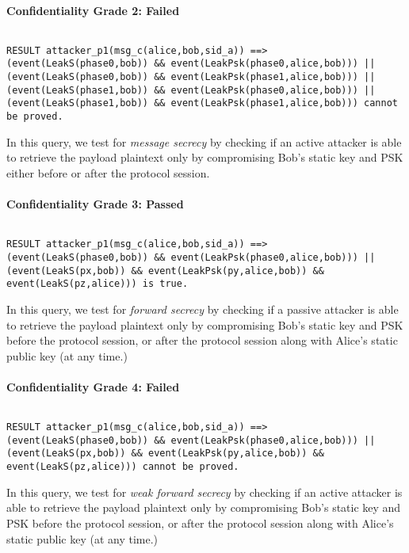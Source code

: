 \paragraph{Confidentiality Grade 2: Failed}$ $
\begin{lstlisting}
RESULT attacker_p1(msg_c(alice,bob,sid_a)) ==> (event(LeakS(phase0,bob)) && event(LeakPsk(phase0,alice,bob))) || (event(LeakS(phase0,bob)) && event(LeakPsk(phase1,alice,bob))) || (event(LeakS(phase1,bob)) && event(LeakPsk(phase0,alice,bob))) || (event(LeakS(phase1,bob)) && event(LeakPsk(phase1,alice,bob))) cannot be proved.
\end{lstlisting}

In this query, we test for \emph{message secrecy} by checking if an active attacker is able to retrieve the payload plaintext only by compromising Bob's static key and PSK either before or after the protocol session.


\paragraph{Confidentiality Grade 3: Passed}$ $
\begin{lstlisting}
RESULT attacker_p1(msg_c(alice,bob,sid_a)) ==> (event(LeakS(phase0,bob)) && event(LeakPsk(phase0,alice,bob))) || (event(LeakS(px,bob)) && event(LeakPsk(py,alice,bob)) && event(LeakS(pz,alice))) is true.
\end{lstlisting}

In this query, we test for \emph{forward secrecy} by checking if a passive attacker is able to retrieve the payload plaintext only by compromising Bob's static key and PSK before the protocol session, or after the protocol session along with Alice's static public key (at any time.)


\paragraph{Confidentiality Grade 4: Failed}$ $
\begin{lstlisting}
RESULT attacker_p1(msg_c(alice,bob,sid_a)) ==> (event(LeakS(phase0,bob)) && event(LeakPsk(phase0,alice,bob))) || (event(LeakS(px,bob)) && event(LeakPsk(py,alice,bob)) && event(LeakS(pz,alice))) cannot be proved.
\end{lstlisting}

In this query, we test for \emph{weak forward secrecy} by checking if an active attacker is able to retrieve the payload plaintext only by compromising Bob's static key and PSK before the protocol session, or after the protocol session along with Alice's static public key (at any time.)


